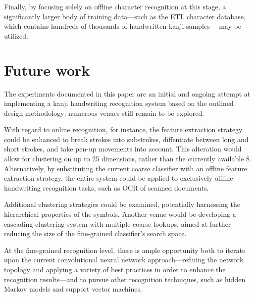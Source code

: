 \documentclass[10pt,conference,a4paper]{IEEEtran}
\begin{document}


	Finally, by focusing solely on offline character recognition at this stage, a significantly larger body of training data---such
	as the ETL character database, which contains hundreds of thousands of handwritten kanji samples \cite{yamamoto1986recognition}---may be utilized. 



	\section{Future work}
	\label{sec:future_work}

	The experiments documented in this paper are an initial and ongoing attempt at implementing a kanji handwriting recognition \mbox{system}
	based on the outlined design methodology; numerous venues still remain to be explored.
	
	With regard to online recognition, for instance, the feature extraction strategy could be enhanced to break strokes into
	substrokes, diffentiate between long and short strokes, and take pen-up movements into account.
	This alteration would allow for clustering on up to 25 dimensions, rather than the currently available 8.
	Alternatively, by substituting the current coarse classifier with an offline feature extraction strategy, the entire system could
	be applied to exclusively offline handwriting recognition tasks, such as OCR of scanned documents.

	Additional clustering strategies could be examined, potentially harnessing the hierarchical properties of the symbols.
	Another venue would be developing a cascading clustering system with multiple coarse lookups, aimed at further
	reducing the size of the fine-grained classifier's search space.
	
	At the fine-grained recognition level, there is ample opportunity both to iterate upon the current convolutional neural network
	approach---refining the network topology and applying a variety of best practices \cite{simard2003best} in order to enhance the 
	recognition results---and to pursue other recognition techniques, such as hidden Markov models and support vector machines.
	


	
\end{document}
